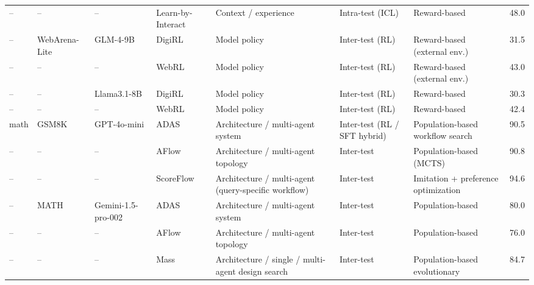 \begin{table}[t]
\begin{tabularx}{\textwidth}{l l p{2.0cm} p{2.4cm} X X X c}
-- & -- & -- & Learn-by-Interact \citep{su2025learnbyinteractdatacentricframeworkselfadaptive}
& Context / experience
& Intra-test (ICL)
& Reward-based
& 48.0 \\

-- & WebArena-Lite & GLM-4-9B & DigiRL \citep{bai2024digirl}
& Model policy
& Inter-test (RL)
& Reward-based (external env.)
& 31.5 \\

-- & -- & -- & WebRL \citep{qi2024webrl}
& Model policy
& Inter-test (RL)
& Reward-based (external env.)
& 43.0 \\

-- & -- & Llama3.1-8B & DigiRL \citep{bai2024digirl}
& Model policy
& Inter-test (RL)
& Reward-based
& 30.3 \\

-- & -- & -- & WebRL \citep{qi2024webrl}
& Model policy
& Inter-test (RL)
& Reward-based
& 42.4 \\
\midrule

math & GSM8K & GPT-4o-mini & ADAS \citep{hu2024automated}
& Architecture / multi-agent system
& Inter-test (RL / SFT hybrid)
& Population-based workflow search
& 90.5 \\

-- & -- & -- & AFlow \citep{zhang2024aflow}
& Architecture / multi-agent topology
& Inter-test
& Population-based (MCTS)
& 90.8 \\

-- & -- & -- & ScoreFlow \citep{wang2025scoreflow}
& Architecture / multi-agent (query-specific workflow)
& Inter-test
& Imitation + preference optimization
& 94.6 \\

-- & MATH & Gemini-1.5-pro-002 & ADAS \citep{hu2024automated}
& Architecture / multi-agent system
& Inter-test
& Population-based
& 80.0 \\

-- & -- & -- & AFlow \citep{zhang2024aflow}
& Architecture / multi-agent topology
& Inter-test
& Population-based
& 76.0 \\

-- & -- & -- & Mass \citep{zhang2025maas}
& Architecture / single / multi-agent design search
& Inter-test
& Population-based evolutionary
& 84.7 \\
\bottomrule

\end{tabularx}
\end{table}
